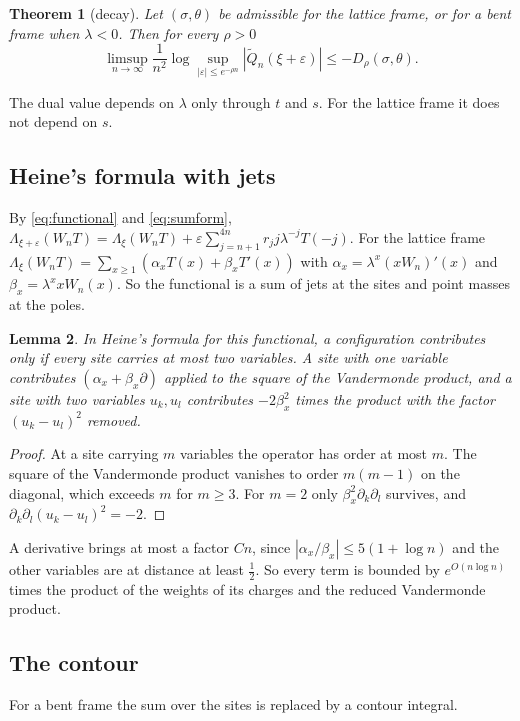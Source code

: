 \documentclass[11pt]{amsart}
\newtheorem{theorem}{Theorem}[section]
\newtheorem{lemma}[theorem]{Lemma}
\theoremstyle{definition}
\theoremstyle{remark}
\numberwithin{equation}{section}
\begin{document}
\begin{theorem}[decay]\label{thm:LD}
Let $(\sigma,\theta)$ be admissible for the lattice frame, or for a bent frame when $\lambda<0$. Then for every
$\rho>0$
\[
 \limsup_{n\to\infty}\frac1{n^2}\log\sup_{|\varepsilon|\le e^{-\rho n}}|\tilde Q_n(\xi+\varepsilon)|\le-D_\rho(\sigma,\theta).
\]
\end{theorem}

The dual value depends on $\lambda$ only through $t$ and $s$. For the lattice frame it does not depend on $s$.

\subsection{Heine's formula with jets}
By \eqref{eq:functional} and \eqref{eq:sumform},
$\Lambda_{\xi+\varepsilon}(W_nT)=\Lambda_\xi(W_nT)+\varepsilon\sum_{j=n+1}^{4n}r_jj\lambda^{-j}T(-j)$. For the lattice frame
$\Lambda_\xi(W_nT)=\sum_{x\ge1}(\alpha_xT(x)+\beta_xT'(x))$ with $\alpha_x=\lambda^x(xW_n)'(x)$ and
$\beta_x=\lambda^xxW_n(x)$. So the functional is a sum of jets at the sites and point masses at the poles.

\begin{lemma}\label{lem:cap}
In Heine's formula for this functional, a configuration contributes only if every site carries at most two variables.
A site with one variable contributes $(\alpha_x+\beta_x\partial)$ applied to the square of the Vandermonde product, and
a site with two variables $u_k,u_l$ contributes $-2\beta_x^2$ times the product with the factor $(u_k-u_l)^2$ removed.
\end{lemma}

\begin{proof}
At a site carrying $m$ variables the operator has order at most $m$. The square of the Vandermonde product vanishes
to order $m(m-1)$ on the diagonal, which exceeds $m$ for $m\ge3$. For $m=2$ only $\beta_x^2\partial_k\partial_l$ survives,
and $\partial_k\partial_l(u_k-u_l)^2=-2$.
\end{proof}

A derivative brings at most a factor $Cn$, since $|\alpha_x/\beta_x|\le5(1+\log n)$ and the other variables are at
distance at least $\frac12$. So every term is bounded by $e^{O(n\log n)}$ times the product of the weights of its
charges and the reduced Vandermonde product.

\subsection{The contour}
For a bent frame the sum over the sites is replaced by a contour integral.
\end{document}

